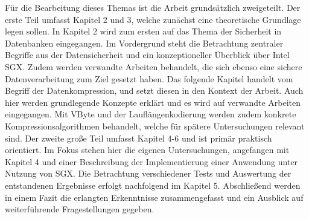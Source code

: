 Für die Bearbeitung dieses Themas ist die Arbeit grundsätzlich zweigeteilt. Der erste Teil umfasst Kapitel 2 und 3, welche zunächst eine theoretische Grundlage legen sollen. In Kapitel 2 wird zum ersten auf das Thema der Sicherheit in Datenbanken eingegangen. Im Vordergrund steht die Betrachtung zentraler Begriffe aus der Datensicherheit und ein konzeptioneller Überblick über Intel \ac{SGX}. Zudem werden verwandte Arbeiten behandelt, die sich ebenso eine sichere Datenverarbeitung zum Ziel gesetzt haben. Das folgende Kapitel handelt vom Begriff der Datenkompression, und setzt diesen in den Kontext der Arbeit. Auch hier werden grundlegende Konzepte erklärt und es wird auf verwandte Arbeiten eingegangen. Mit VByte und der Lauflängenkodierung werden zudem konkrete Kompressionsalgorithmen behandelt, welche für spätere Untersuchungen relevant sind. Der zweite große Teil umfasst Kapitel 4-6 und ist primär praktisch orientiert. Im Fokus stehen hier die eigenen Untersuchungen, angefangen mit Kapitel 4 und einer Beschreibung der Implementierung einer Anwendung unter Nutzung von \ac{SGX}. Die Betrachtung verschiedener Tests und Auswertung der entstandenen Ergebnisse erfolgt nachfolgend im Kapitel 5. Abschließend werden in einem Fazit die erlangten Erkenntnisse zusammengefasst und ein Ausblick auf weiterführende Fragestellungen gegeben.